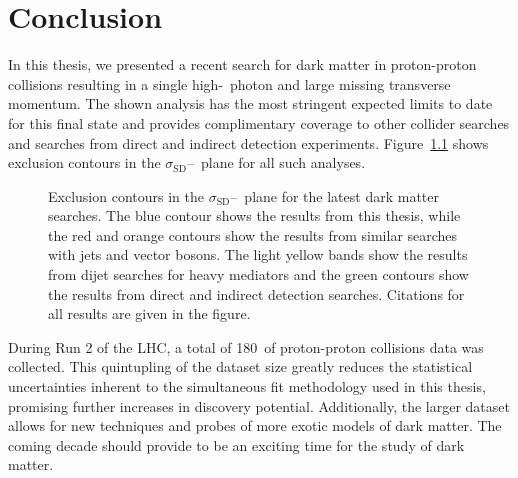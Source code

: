 \chapter{Conclusion}
\label{sec:conclusion}

In this thesis, we presented a recent search for dark matter in proton-proton collisions resulting in a single high-\pt\ photon and large missing transverse momentum.
The shown analysis has the most stringent expected limits to date for this final state and provides complimentary coverage to other collider searches and searches from direct and indirect detection experiments.
Figure~\ref{fig:final_plot} shows exclusion contours in the $\sigma_{\text{SD}}$--\mdm\ plane for all such analyses.

\begin{figure}[htbp]
  \centering
  \caption{
    Exclusion contours in the $\sigma_{\text{SD}}$--\mdm\ plane for the latest dark matter searches.
    The blue contour shows the results from this thesis, while the red and orange contours show the results from similar searches with jets and vector bosons.
    The light yellow bands show the results from dijet searches for heavy mediators and the green contours show the results from direct and indirect detection searches.
    Citations for all results are given in the figure.
    }
    \label{fig:final_plot}
\end{figure}

During Run 2 of the LHC, a total of 180\fbinv\ of proton-proton collisions data was collected.
This quintupling of the dataset size greatly reduces the statistical uncertainties inherent to the simultaneous fit methodology used in this thesis, promising further increases in discovery potential.
Additionally, the larger dataset allows for new techniques and probes of more exotic models of dark matter.
The coming decade should provide to be an exciting time for the study of dark matter.
